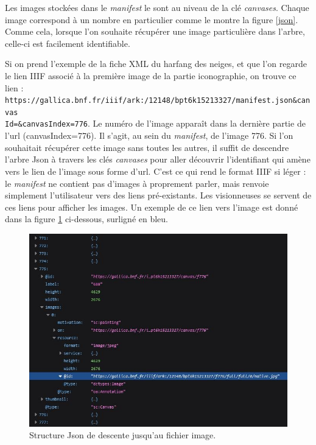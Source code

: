\documentclass[a4paper,12pt,twoside]{book}
\begin{document}
Les images stockées dans le \textit{manifest} le sont au niveau de la clé \textit{canvases}. Chaque image correspond à un nombre en particulier comme le montre la figure \ref{json}. Comme cela, lorsque l'on souhaite récupérer une image particulière dans l'arbre, celle-ci est facilement identifiable.

Si on prend l'exemple de la fiche XML du harfang des neiges, et que l'on regarde le lien \acrshort{IIIF} associé à la première image de la partie iconographie, on trouve ce lien :\\ \texttt{https://gallica.bnf.fr/iiif/ark:/12148/bpt6k15213327/manifest.json\&canvas\\Id=\&canvasIndex=776}. Le numéro de l'image apparaît dans la dernière partie de l'url (canvasIndex=776). Il s'agit, au sein du \textit{manifest}, de l'image 776. Si l'on souhaitait récupérer cette image sans toutes les autres, il suffit de descendre l'arbre Json à travers les clés \textit{canvases} pour aller découvrir l'identifiant qui amène vers le lien de l'image sous forme d'url. C'est ce qui rend le format \acrshort{IIIF} si léger : le \textit{manifest} ne contient pas d'images à proprement parler, mais renvoie simplement l'utilisateur vers des liens pré-existants. Les visionneuses se servent de ces liens pour afficher les images. Un exemple de ce lien vers l'image est donné dans la figure \ref{harfang} ci-dessous, surligné en bleu.

\begin{figure}[H]
    \centering
    \includegraphics[width=13cm]{img/partie_3/harfang.JPG}
    \caption{Structure Json de descente jusqu'au fichier image.}
    \label{harfang}
\end{figure}
\end{document}
